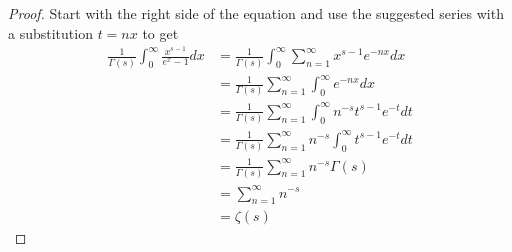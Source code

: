 \documentclass[10pt]{article}
\theoremstyle{plain}
\theoremstyle{remark}
\begin{document}
\begin{proof}
  Start with the right side of the equation and use the suggested series
  with a substitution $t=nx$ to get
  \begin{align*}
    \frac{1}{\Gamma(s)}\int_0^\infty \frac{x^{s-1}}{e^x-1}dx &= \frac{1}{\Gamma(s)}\int_0^\infty\sum_{n=1}^\infty x^{s-1}e^{-nx}dx\\
                                                &=\frac{1}{\Gamma(s)}\sum_{n=1}^\infty \int_0^\infty e^{-nx}dx\\
                                                &=\frac{1}{\Gamma(s)}\sum_{n=1}^\infty \int_0^\infty n^{-s}t^{s-1}e^{-t}dt\\
                                                &=\frac{1}{\Gamma(s)}\sum_{n=1}^\infty n^{-s}\int_0^\infty t^{s-1}e^{-t}dt\\
                                                &=\frac{1}{\Gamma(s)}\sum_{n=1}^\infty n^{-s}\Gamma(s)\\
                                                &=\sum_{n=1}^\infty n^{-s}\\
                                                &= \zeta(s)
  \end{align*}
\end{proof}

\end{document}
